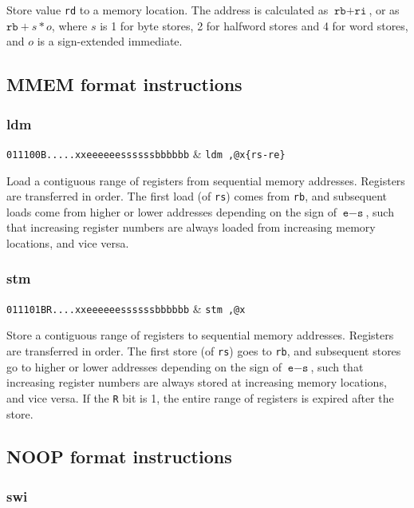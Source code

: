 Store value \texttt{rd} to a memory location. The address is calculated as $\texttt{rb}+\texttt{ri}$, or as $\texttt{rb}+s*o$, where $s$ is 1 for byte stores, 2 for halfword stores and 4 for word stores, and $o$ is a sign-extended immediate.

\subsection{MMEM format instructions}

\subsubsection{ldm}

\decfmt
\texttt{011100B.....xxeeeeeessssssbbbbbb} & \texttt{ldm ,@x\{rs-re\}}
\finfmt

Load a contiguous range of registers from sequential memory addresses. Registers are transferred in order. The first load (of \texttt{rs}) comes from \texttt{rb}, and subsequent loads come from higher or lower addresses depending on the sign of $\texttt{e}-\texttt{s}$, such that increasing register numbers are always loaded from increasing memory locations, and vice versa.

\subsubsection{stm}

\decfmt
\texttt{011101BR....xxeeeeeessssssbbbbbb} & \texttt{stm ,@x}
\finfmt

Store a contiguous range of registers to sequential memory addresses. Registers are transferred in order. The first store (of \texttt{rs}) goes to \texttt{rb}, and subsequent stores go to higher or lower addresses depending on the sign of $\texttt{e}-\texttt{s}$, such that increasing register numbers are always stored at increasing memory locations, and vice versa. If the \texttt{R} bit is 1, the entire range of registers is expired after the store.

\subsection{NOOP format instructions}

\subsubsection{swi}

